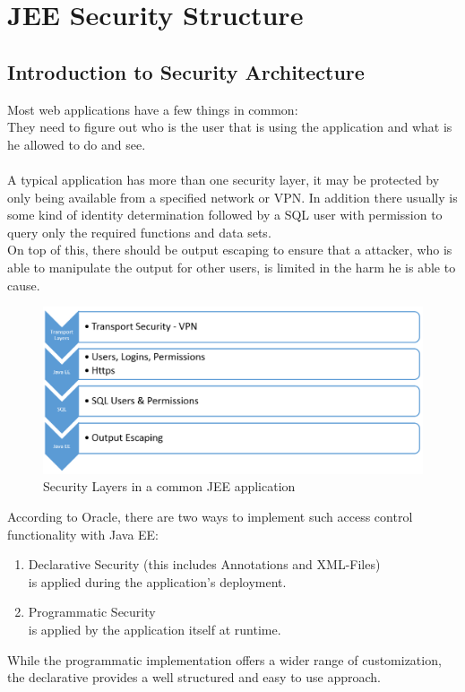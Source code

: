 \documentclass[12pt,a4paper]{report}
\begin{document}
\chapter{JEE Security Structure}
\section{Introduction to Security Architecture}
Most web applications have a few things in common:\\
They need to figure out who is the user that is using the application and what is he allowed to do and see.\\\\
A typical application has more than one security layer, it may be protected by only being available from a specified network or VPN. In addition there usually is some kind of identity determination followed by a SQL user with permission to query only the required functions and data sets.\\
On top of this, there should be output escaping to ensure that a attacker, who is able to manipulate the output for other users, is limited in the harm he is able to cause.\\
\begin{figure}[h]
\centering
\includegraphics[width=1\linewidth]{res/SecurityLayers}
\caption{Security Layers in a common JEE application}
\label{fig:SecurityLayers}
\end{figure}
\newpage \noindent
According to Oracle\cite{oracleDoc}, there are two ways to implement such access control functionality with Java EE:
\begin{enumerate}
	\item Declarative Security (this includes Annotations and XML-Files)\\
	is applied during the application's deployment.
	\item Programmatic Security\\
	is applied by the application itself at runtime.
\end{enumerate}
While the programmatic implementation offers a wider range of customization, the declarative provides a well structured and easy to use approach.\\
\end{document}
